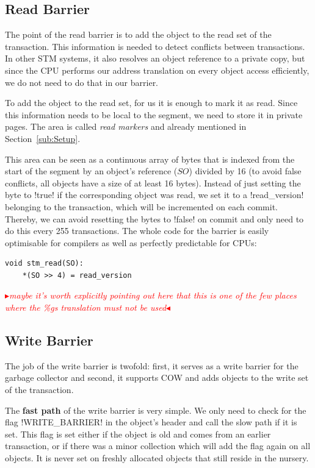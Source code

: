 \documentclass{sigplanconf}
\makeatletter
\renewcommand\lstinline[1][]{%
  \Collectverb{\@@myverb}%
}
\def\@@myverb#1{%
    \begingroup
    \fboxsep=0.2em
    \colorbox{verylightgray}{\oldlstinline|#1|}%
    \endgroup
}
\newcommand{\mynote}[2]{%
  \textcolor{red}{%
    \fbox{\bfseries\sffamily\scriptsize#1}%
    {\small$\blacktriangleright$\textsf{\emph{#2}}$\blacktriangleleft$}%
  }%
}
\newcommand\cfbolz[1]{\mynote{cfbolz}{#1}}
\makeatother
\begin{document}
\subsection{Read Barrier}

The point of the read barrier is to add the object to the read set of
the transaction. This information is needed to detect conflicts
between transactions. In other STM systems, it also resolves an object reference to
a private copy, but since the CPU performs our address translation on
every object access efficiently, we do not need to do that in our
barrier.

To add the object to the read set, for us it is enough to mark it as
read. Since this information needs to be local to the segment, we need
to store it in private pages. The area is called \emph{read markers}
and already mentioned in Section~\ref{sub:Setup}.

This area can be seen as a continuous array of bytes that is indexed
from the start of the segment by an object's reference ($SO$) divided
by 16 (to avoid false conflicts, all objects have a size of at least 16 bytes).
Instead of just setting the byte to \lstinline!true!  if the
corresponding object was read, we set it to a \lstinline!read_version!
belonging to the transaction, which will be incremented on each
commit.  Thereby, we can avoid resetting the bytes to
\lstinline!false!  on commit and only need to do this every 255
transactions. The whole code for the barrier is easily optimisable for
compilers as well as perfectly predictable for CPUs:

\begin{lstlisting}
void stm_read(SO):
    *(SO >> 4) = read_version
\end{lstlisting}

\cfbolz{maybe it's worth explicitly pointing out here that this is one of the
    few places where the \%gs translation must not be used}


\subsection{Write Barrier}

The job of the write barrier is twofold: first, it serves as a write
barrier for the garbage collector and second, it supports COW and adds
objects to the write set of the transaction.

The \textbf{fast path} of the write barrier is very simple. We only
need to check for the flag \lstinline!WRITE_BARRIER!  in the object's
header and call the slow path if it is set. This flag is set either if
the object is old and comes from an earlier transaction, or if there
was a minor collection which will add the flag again on all
objects. It is never set on freshly allocated objects that still
reside in the nursery.
\end{document}
